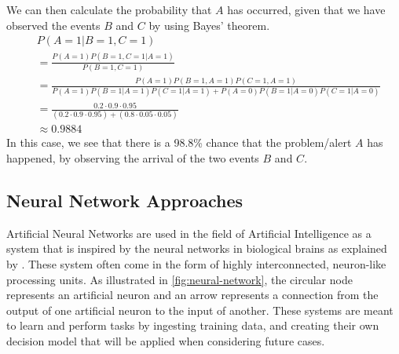 We can then calculate the probability that $A$ has occurred, given that we have observed the events $B$ and $C$ by using Bayes' theorem.
\begin{align*}
    &P(A=1 | B=1, C=1)\\
    &=\frac{P(A=1)P(B=1,C=1|A=1)}{P(B=1,C=1)}\\
    &=\frac{P(A=1)P(B=1,A=1)P(C=1,A=1)}{P(A=1)P(B=1|A=1)P(C=1|A=1)+P(A=0)P(B=1|A=0)P(C=1|A=0)}\\
    &=\frac{0.2\cdot0.9\cdot0.95}{(0.2\cdot0.9\cdot0.95)+(0.8\cdot0.05\cdot0.05)}\\
    &\approx 0.9884
\end{align*}
In this case, we see that there is a 98.8\% chance that the problem/alert $A$ has happened, by observing the arrival of the two events $B$ and $C$.


\subsection{Neural Network Approaches}
Artificial Neural Networks are used in the field of Artificial Intelligence as a system that is inspired by the neural networks in biological brains as explained by \textcite{chen2019design}. These system often come in the form of highly interconnected, neuron-like processing units. As illustrated in \cref{fig:neural-network}, the circular node represents an artificial neuron and an arrow represents a connection from the output of one artificial neuron to the input of another.
These systems are meant to learn and perform tasks by ingesting training data, and creating their own decision model that will be applied when considering future cases.

